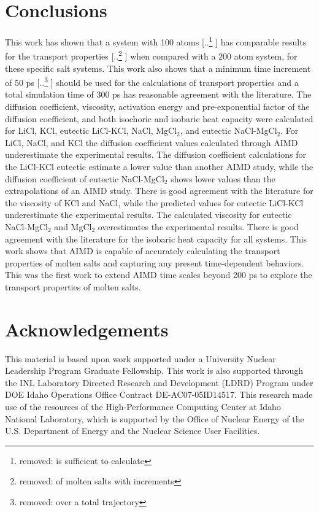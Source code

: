 \documentclass[review]{elsarticle}
\providecommand{\DIFaddtex}[1]{{\protect\color{blue} \sf #1}} %
\providecommand{\DIFdeltex}[1]{{\protect\color{red} [..\footnote{removed: #1} ]}} %
\providecommand{\DIFaddbegin}{} %
\providecommand{\DIFaddend}{} %
\providecommand{\DIFdelbegin}{} %
\providecommand{\DIFdelend}{} %
\providecommand{\DIFadd}[1]{\texorpdfstring{\DIFaddtex{#1}}{#1}} %
\providecommand{\DIFdel}[1]{\texorpdfstring{\DIFdeltex{#1}}{}} %
\newcommand{\DIFscaledelfig}{0.5}
\newlength{\DIFdelgraphicswidth} %
\newlength{\DIFdelgraphicsheight} %
\newcommand{\DIFaddincludegraphics}[2][]{{\color{blue}\fbox{\DIFOincludegraphics[#1]{#2}}}} %
\newcommand{\DIFdelincludegraphics}[2][]{%
\sbox{\DIFdelgraphicsbox}{\DIFOincludegraphics[#1]{#2}}%
\settoboxwidth{\DIFdelgraphicswidth}{\DIFdelgraphicsbox} %
\settoboxtotalheight{\DIFdelgraphicsheight}{\DIFdelgraphicsbox} %
\scalebox{\DIFscaledelfig}{%
\parbox[b]{\DIFdelgraphicswidth}{\usebox{\DIFdelgraphicsbox}\\[-\baselineskip] \rule{\DIFdelgraphicswidth}{0em}}\llap{\resizebox{\DIFdelgraphicswidth}{\DIFdelgraphicsheight}{%
\setlength{\unitlength}{\DIFdelgraphicswidth}%
\begin{picture}(1,1)%
\thicklines\linethickness{2pt} %
{\color[rgb]{1,0,0}\put(0,0){\framebox(1,1){}}}%
{\color[rgb]{1,0,0}\put(0,0){\line( 1,1){1}}}%
{\color[rgb]{1,0,0}\put(0,1){\line(1,-1){1}}}%
\end{picture}%
}\hspace*{3pt}}} %
} %
\DeclareRobustCommand{\DIFaddbegin}{\DIFOaddbegin \let\includegraphics\DIFaddincludegraphics} %
\DeclareRobustCommand{\DIFaddend}{\DIFOaddend \let\includegraphics\DIFOincludegraphics} %
\DeclareRobustCommand{\DIFdelbegin}{\DIFOdelbegin \let\includegraphics\DIFdelincludegraphics} %
\DeclareRobustCommand{\DIFdelend}{\DIFOaddend \let\includegraphics\DIFOincludegraphics} %
\begin{document}
\section{Conclusions}
This work has shown that a system with 100 atoms \DIFdelbegin \DIFdel{is sufficient to calculate }\DIFdelend \DIFaddbegin \DIFadd{has comparable results for }\DIFaddend the transport properties \DIFdelbegin \DIFdel{of molten salts with increments }\DIFdelend \DIFaddbegin \DIFadd{when compared with a 200 atom system, for these specific salt systems. This work also shows that a minimum time increment }\DIFaddend of 50 ps \DIFdelbegin \DIFdel{over a total trajectory }\DIFdelend \DIFaddbegin \DIFadd{should be used for the calculations of transport properties and a total simulation time }\DIFaddend of 300 ps \DIFaddbegin \DIFadd{has reasonable agreement with the literature}\DIFaddend . The diffusion coefficient, viscosity, activation energy and pre-exponential factor of the diffusion coefficient, and both isochoric and isobaric heat capacity were calculated for LiCl, KCl, eutectic LiCl-KCl, NaCl, MgCl$_2$, and eutectic NaCl-MgCl$_2$. For LiCl, NaCl, and KCl the diffusion coefficient values calculated through AIMD underestimate the experimental results. The diffusion coefficient calculations for the LiCl-KCl eutectic estimate a lower value than another AIMD study, while the diffusion coefficient of eutectic NaCl-MgCl$_2$ shows lower values than the extrapolations of an AIMD study. There is good agreement with the literature for the viscosity of KCl and NaCl, while the predicted values for eutectic LiCl-KCl underestimate the experimental results. The calculated viscosity for eutectic NaCl-MgCl$_2$ and MgCl$_2$ overestimates the experimental results. There is good agreement with the literature for the isobaric heat capacity for all systems. This work shows that AIMD is capable of accurately calculating the transport properties of molten salts and capturing any present time-dependent behaviors. This was the first work to extend AIMD time scales beyond 200 ps to explore the transport properties of molten salts.

\section{Acknowledgements}

This material is based upon work supported under a University Nuclear Leadership Program Graduate Fellowship. This work is also supported through the INL Laboratory Directed Research and Development (LDRD) Program under DOE Idaho Operations Office Contract DE-AC07-05ID14517. This research made use of the resources of the High-Performance Computing Center at Idaho National Laboratory, which is supported by the Office of Nuclear Energy of the U.S. Department of Energy and the Nuclear Science User Facilities.  
\FloatBarrier
\end{document}

